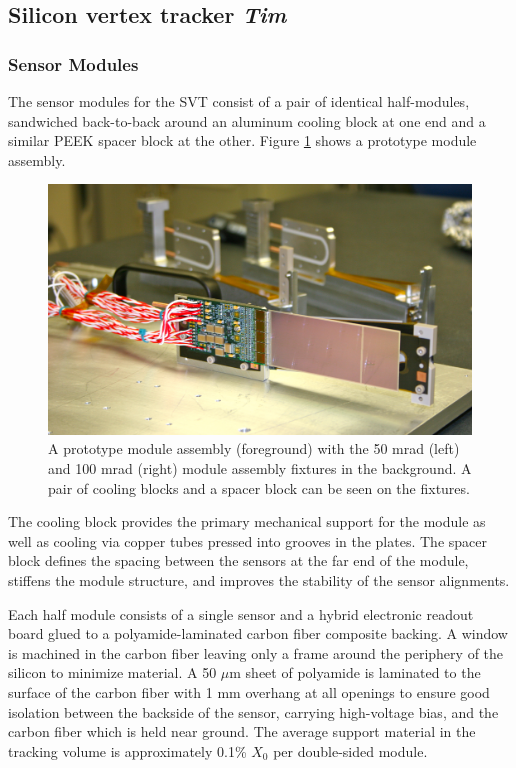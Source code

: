 \subsection{Silicon vertex tracker {\it Tim}}
\label{sec:svtŧ}


\subsubsection{Sensor Modules}

The sensor modules for the SVT consist of a pair of identical half-modules, sandwiched back-to-back around an aluminum cooling block at one end and a similar PEEK spacer block at the other. Figure \ref{fig:tracker_module} shows a prototype module assembly.
\begin{figure}[ht]
    \includegraphics[width=\textwidth]{svt/IMG_5200}
\caption{\small{A prototype module assembly (foreground) with the 50 mrad (left) and 100 mrad (right) module assembly fixtures in the background.  A pair of cooling blocks and a spacer block can be seen on the fixtures.} }
\label{fig:tracker_module}
\end{figure}
The cooling block provides the primary mechanical support for the module as well as cooling via copper tubes pressed into grooves in the plates. The spacer block defines the spacing between the sensors at the far end of the module, stiffens the module structure, and improves the stability of the sensor alignments.  

Each half module consists of a single sensor and a hybrid electronic readout board glued to a polyamide-laminated carbon fiber composite backing.  A window is machined in the carbon fiber leaving only a frame around the periphery of the silicon to minimize material. A 50 $\mu$m sheet of polyamide is laminated to the surface of the carbon fiber with 1 mm overhang at all openings to ensure good isolation between the backside of the sensor, carrying high-voltage bias, and the carbon fiber which is held near ground.  The average support material in the tracking volume is approximately 0.1\% $X_{0}$ per double-sided module.

